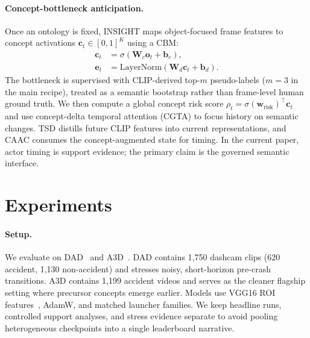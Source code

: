 \documentclass[11pt]{article}
\newcommand{\method}{\textsc{INSIGHT}}
\newcommand{\cbm}{\textsc{CBM}}
\newcommand{\caac}{\textsc{CAAC}}
\newcommand{\cgta}{\textsc{CGTA}}
\newcommand{\tsd}{\textsc{TSD}}
\begin{document}
\paragraph{Concept-bottleneck anticipation.}
Once an ontology is fixed, \method{} maps object-focused frame features to
concept activations $\mathbf{c}_t\in[0,1]^K$ using a \cbm{}:
\begin{equation}
  \begin{split}
  \mathbf{c}_t &= \sigma(\mathbf{W}_c\mathbf{o}_t+\mathbf{b}_c),\\
  \mathbf{e}_t &= \mathrm{LayerNorm}(\mathbf{W}_d\mathbf{c}_t+\mathbf{b}_d).
  \end{split}
\end{equation}
The bottleneck is supervised with CLIP-derived top-$m$ pseudo-labels
($m=3$ in the main recipe), treated as a semantic bootstrap rather than
frame-level human ground truth. We then compute a global concept risk score
$\rho_t=\sigma(\mathbf{w}_{\mathrm{risk}})^\top\mathbf{c}_t$ and use
concept-delta temporal attention (\cgta{}) to focus history on semantic changes.
\tsd{} distills future CLIP features into current representations, and \caac{}
consumes the concept-augmented state for timing. In the current paper, actor
timing is support evidence; the primary claim is the governed semantic interface.

\section{Experiments}

\paragraph{Setup.}
We evaluate on DAD~\citep{ref4} and A3D~\citep{liao2024crash}. DAD contains
1,750 dashcam clips (620 accident, 1,130 non-accident) and stresses noisy,
short-horizon pre-crash transitions. A3D contains 1,199 accident videos and
serves as the cleaner flagship setting where precursor concepts emerge earlier.
Models use VGG16 ROI features~\citep{ref31}, AdamW, and matched launcher
families. We keep headline runs, controlled support analyses, and stress
evidence separate to avoid pooling heterogeneous checkpoints into a single
leaderboard narrative.
\end{document}
